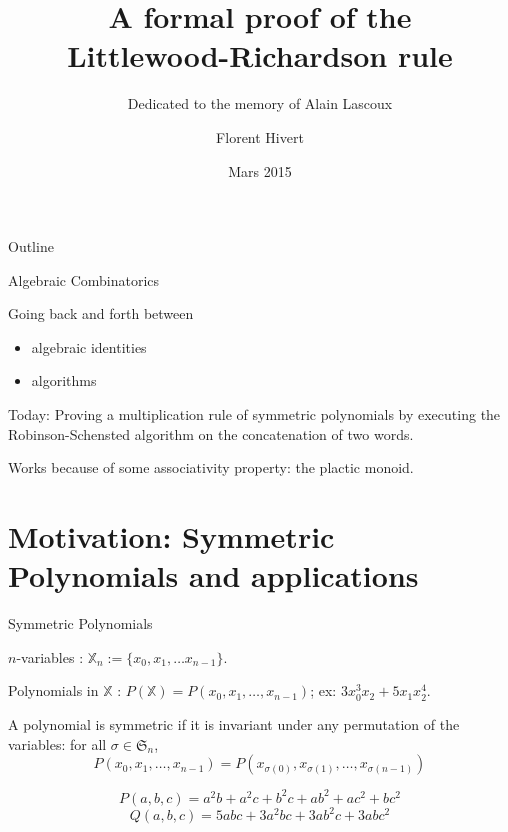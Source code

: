 \documentclass[compress,11pt]{beamer}
\title{\bf\LARGE A formal proof of the \\
Littlewood-Richardson rule\\[5mm]}
\subtitle{Dedicated to the memory of Alain Lascoux}
\author{Florent Hivert}
\institute[LRI]{
  LRI / Université Paris Sud 11 / CNRS}
\date[Décembre 2014]{Mars 2015}
\newcommand{\XX}{{\mathbb X}}
\newcommand{\SG}{{\mathfrak S}}
\renewcommand{\emph}[1]{{\color{red} #1}}
\begin{document}
\frame{\titlepage}

\begin{frame}{Outline}

  \tableofcontents
\end{frame}

\begin{frame}{Algebraic Combinatorics}

\Large
Going back and forth between
\begin{itemize}
\item {\color{red}algebraic identities}
\item {\color{blue}algorithms}
\end{itemize}
\pause\bigskip

Today: Proving a {\color{red}multiplication rule} of symmetric polynomials by
{\color{blue}executing} the Robinson-Schensted algorithm on the
{\color{blue}concatenation of two words}.  \pause\bigskip

Works because of some associativity property: the {\color{red} plactic monoid}.
\end{frame}

\section{Motivation: Symmetric Polynomials and applications}
\begin{frame}{Symmetric Polynomials}
  
  $n$-variables : $\XX_n := \{x_0, x_1, \dots x_{n-1}\}$.

  Polynomials in $\XX$ : $P(\XX) = P(x_0, x_1, \dots, x_{n-1})$; ex: $3x_0^3x_2
  + 5 x_1x_2^4$.

  \begin{DEFN}
    A polynomial is \emph{symmetric} if it is invariant under any permutation of the
    variables: for all $\sigma\in\SG_n$,
    \[P(x_0, x_1, \dots, x_{n-1}) = 
    P(x_{\sigma(0)}, x_{\sigma(1)}, \dots, x_{\sigma({n-1})})\]
  \end{DEFN}

  \[P(a,b,c) = a^2b + a^2c + b^2c + ab^2 + ac^2 + bc^2\]
  \[Q(a,b,c) = 5abc + 3a^2bc + 3ab^2c + 3abc^2\]

\end{frame}
\end{document}
